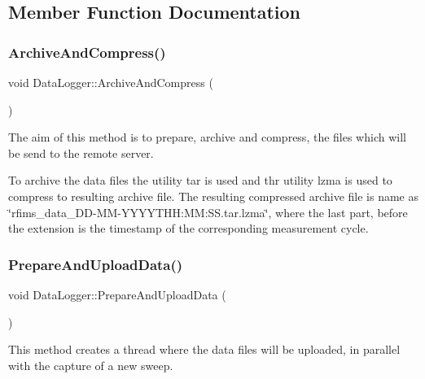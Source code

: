 \subsection{Member Function Documentation}
\mbox{\label{classDataLogger_a147fb7eaee1c38bbf57ef2d6cddf70d5}} 
\subsubsection{\texorpdfstring{Archive\+And\+Compress()}{ArchiveAndCompress()}}
{\footnotesize\ttfamily void Data\+Logger\+::\+Archive\+And\+Compress (\begin{DoxyParamCaption}{ }\end{DoxyParamCaption})}



The aim of this method is to prepare, archive and compress, the files which will be send to the remote server. 

To archive the data files the utility \textquotesingle{}tar\textquotesingle{} is used and thr utility \textquotesingle{}lzma\textquotesingle{} is used to compress to resulting archive file. The resulting compressed archive file is name as \char`\"{}rfims\+\_\+data\+\_\+\+D\+D-\/\+M\+M-\/\+Y\+Y\+Y\+Y\+T\+H\+H\+:\+M\+M\+:\+S\+S.\+tar.\+lzma\char`\"{}, where the last part, before the extension is the timestamp of the corresponding measurement cycle. \mbox{\label{classDataLogger_a98ea7aaa941bbddea8069415e1652759}} 
\subsubsection{\texorpdfstring{Prepare\+And\+Upload\+Data()}{PrepareAndUploadData()}}
{\footnotesize\ttfamily void Data\+Logger\+::\+Prepare\+And\+Upload\+Data (\begin{DoxyParamCaption}{ }\end{DoxyParamCaption})}



This method creates a thread where the data files will be uploaded, in parallel with the capture of a new sweep. 


